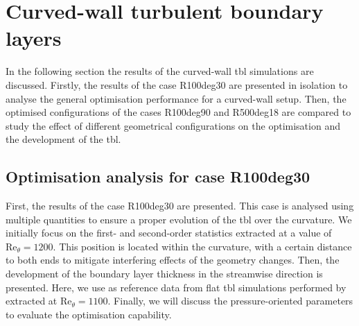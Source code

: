 \section{Curved-wall turbulent boundary layers}\label{sec:curvedResults}

In the following section the results of the curved-wall \acrshort{tbl} simulations are discussed.
Firstly, the results of the case R100deg30 are presented in isolation to analyse the general optimisation performance for a curved-wall setup.
Then, the optimised configurations of the cases R100deg90 and R500deg18 are compared to study the effect of different geometrical configurations on the optimisation and the development of the \acrshort{tbl}.


\subsection{Optimisation analysis for case R100deg30}\label{subsec:R100deg30}
First, the results of the case R100deg30 are presented. 
This case is analysed using multiple quantities to ensure a proper evolution of the \acrshort{tbl} over the curvature.
We initially focus on the first- and second-order statistics extracted at a value of $\mathrm{Re}_{\theta} = 1200$. 
This position is located within the curvature, with a certain distance to both ends to mitigate interfering effects of the geometry changes.
Then, the development of the boundary layer thickness in the streamwise direction is presented. 
Here, we use as reference data from flat \acrshort{tbl} simulations performed by \citet{jimenez_near-wall_2013} extracted at $\mathrm{Re}_{\theta} = 1100$.
Finally, we will discuss the pressure-oriented parameters to evaluate the optimisation capability. 

